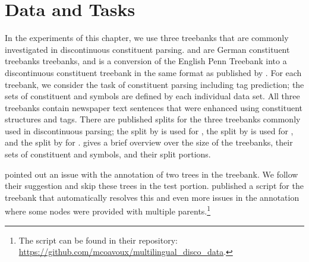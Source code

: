 \documentclass[../../document.tex]{subfiles}
\begin{document}
    \section{Data and Tasks}\label{sec:treebanks}
    In the experiments of this chapter, we use three treebanks that are commonly investigated in discontinuous constituent parsing.
     \citep{Skut98} and \tiger{} \citep{Brants04} are German constituent treebanks treebanks, and \dptb{} is a conversion of the English Penn Treebank \citep{Marcus94} into a discontinuous constituent treebank in the same format as \negra{} published by \citet{EvaKal11}.
    For each treebank, we consider the task of constituent parsing including  tag prediction; the sets of constituent and  symbols are defined by each individual data set.
    All three treebanks contain newspaper text sentences that were enhanced using constituent structures and  tags.
    There are published splits for the three treebanks commonly used in discontinuous parsing; the split by \citet{DubKel03} is used for \negra{}, the split by \citet{Sed13} is used for  \tiger{}, and the split by \citet{collins-1996-new} for \dptb{}.
     gives a brief overview over the size of the treebanks, their sets of constituent and  symbols, and their split portions.
    
    \citet{Maier15} pointed out an issue with the annotation of two trees in the \tiger{} treebank.
    We follow their suggestion and skip these trees in the test portion.
    \citet{CoaCoh19} published a script for the \tiger{} treebank that automatically resolves this and even more issues in the annotation where some nodes were provided with multiple parents.\footnote{The script can be found in their repository: \url{https://github.com/mcoavoux/multilingual_disco_data}.}
\end{document}
